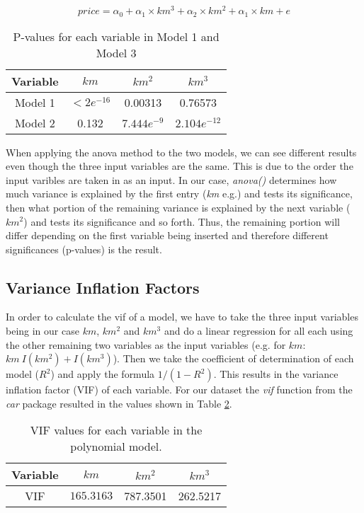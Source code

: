 \begin{equation}
	price = \alpha_0 + \alpha_1 \times km^3 + \alpha_2 \times km^2 + \alpha_1 \times km +e
\end{equation}

\begin{table}[H]
\centering
\begin{tabular}{||c |c c c||}
 \hline
 Variable & $km$ & $km^2$ & $km^3$ \\ [0.5ex]
 \hline
 Model 1 & $< 2 e^{-16}$ & 0.00313 & 0.76573 \\
 Model 2 & 0.132 & $7.444 e^{-9}$ & $2.104 e^{-12}$ \\
 \hline
\end{tabular}
\caption{P-values for each variable in Model 1 and Model 3}
\label{tab:3}
\end{table}

\noindent
When applying the anova method to the two models, we can see different results even though the three input variables are the same. This is due to the order the input varibles are taken in as an input. In our case, \textit{anova()} determines how much variance is explained by the first entry (\textit{km} e.g.) and tests its significance, then what portion of the remaining variance is explained by the next variable ($km^2$) and tests its significance and so forth. Thus, the remaining portion will differ depending on the first variable being inserted and therefore  different significances (p-values) is the result.


\subsection{Variance Inflation Factors} %
\label{sub:variance_inflation_factors}

In order to calculate the vif of a model, we have to take the three input variables 
being in our case $km$, $km^2$ and $km^3$ and do a linear regression for all each
using the other remaining two variables as the input variables (e.g. for $km
$: $km ~ I(km^2) + I(km^3)$). Then we take the coefficient of determination of each model ($R^2$) and apply the formula $1 / ( 1 - R^2 )$. This results in the variance inflation factor (VIF) of each variable. For our dataset the \textit{vif} function from the \textit{car} package resulted in the values shown in Table \ref{tab:vif}.

\begin{table}[H]
\centering
\begin{tabular}{||c ||c c c||}
 \hline
 Variable & $km$ & $km^2$ & $km^3$ \\ [0.5ex]
 \hline
 VIF & $ 165.3163 $ & 787.3501 & 262.5217 \\
 \hline
\end{tabular}
\caption{VIF values for each variable in the polynomial model.}
\label{tab:vif}
\end{table}

